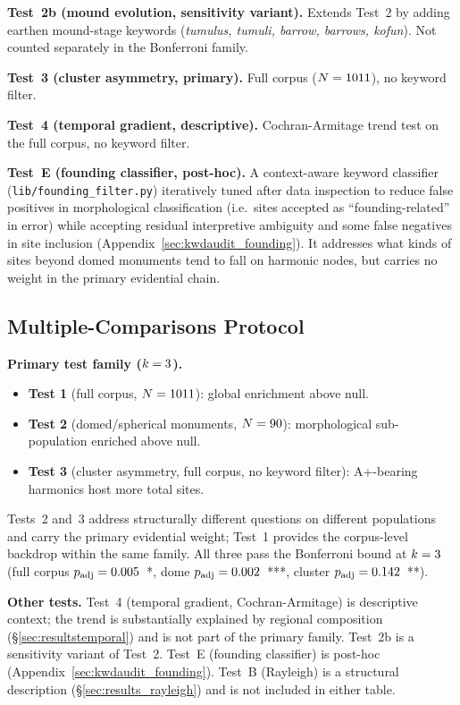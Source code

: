 \documentclass[HARVARD,twocolumn]{USG}
\begin{document}
\textbf{Test~2b (mound evolution, sensitivity variant).}
Extends Test~2 by adding earthen mound-stage keywords
(\textit{tumulus, tumuli, barrow, barrows, kofun}).
Not counted separately in the Bonferroni family.

\textbf{Test~3 (cluster asymmetry, primary).}
Full corpus ($N = 1011$), no keyword filter.

\textbf{Test~4 (temporal gradient, descriptive).}
Cochran-Armitage trend test on the full corpus, no keyword filter.

\textbf{Test~E (founding classifier, post-hoc).}
A context-aware keyword classifier
(\texttt{lib/founding\_filter.py}) iteratively tuned after data
inspection to reduce false positives in morphological classification
(i.e.\ sites accepted as ``founding-related'' in error) while accepting
residual interpretive ambiguity and some false negatives in site inclusion
(Appendix~\ref{sec:kwdaudit_founding}).
It addresses what kinds of sites beyond domed
monuments tend to fall on harmonic nodes, but carries no weight
in the primary evidential chain.

\subsection{Multiple-Comparisons Protocol}
\label{sec:bonferroni}

\textbf{Primary test family ($k = 3$).}
\begin{itemize}
  \item \textbf{Test 1} (full corpus, $N = 1011$):
    global enrichment above \NullRateAp{} null.
  \item \textbf{Test 2} (domed/spherical monuments, $N = 90$):
    morphological sub-population enriched above \NullRateAp{} null.
  \item \textbf{Test 3} (cluster asymmetry, full corpus, no keyword filter):
    A+-bearing harmonics host more total sites.
\end{itemize}
Tests~2 and~3 address structurally different questions on different
populations and carry the primary evidential weight; Test~1 provides the
corpus-level backdrop within the same family.
All three pass the Bonferroni bound at $k = 3$
(full corpus $p_\mathrm{adj} = 0.005$~*,
dome $p_\mathrm{adj} = 0.002$~***,
cluster $p_\mathrm{adj} = 0.142$~**).

\textbf{Other tests.}
Test~4 (temporal gradient, Cochran-Armitage) is descriptive context;
the trend is substantially explained by regional composition
(\S\ref{sec:resultstemporal}) and is not part of the primary family.
Test~2b is a sensitivity variant of Test~2.
Test~E (founding classifier) is post-hoc (Appendix~\ref{sec:kwdaudit_founding}).
Test~B (Rayleigh) is a structural description (\S\ref{sec:results_rayleigh})
and is not included in either table.
\end{document}
